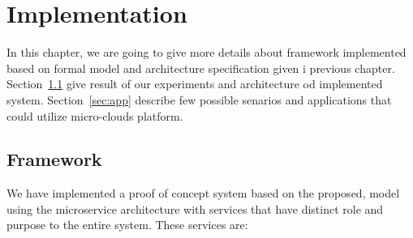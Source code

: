 \chapter{Implementation}\label{chapter:Implementation}
%
In this chapter, we are going to give more details about framework implemented based on formal model and architecture specification given i previous chapter.
Section~\ref{sec:results} give result of our experiments and architecture od implemented system. Section~\ref{sec:app} describe few possible senarios and applications that could utilize micro-clouds platform.
%
%
\section{Framework}\label{sec:results}
%
We have implemented a proof of concept system based on the proposed, model using the microservice architecture with services that have distinct role and purpose to the entire system. These services are:

